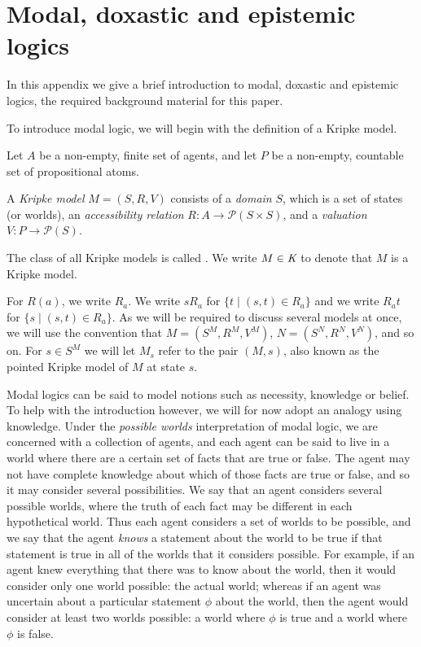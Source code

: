 \chapter{Modal, doxastic and epistemic logics}\label{modal}

In this appendix we give a brief introduction to modal, doxastic and epistemic
logics, the required background material for this paper.

To introduce modal logic, we will begin with the definition of a Kripke model.

Let $A$ be a non-empty, finite set of agents, and let $P$ be a non-empty,
countable set of propositional atoms.

\begin{definition}
A \textit{Kripke model} $M = (S, R, V)$ consists of a \textit{domain} $S$, which
is a set of states (or worlds), an \textit{accessibility relation} $R : A \to
\mathcal{P}(S \times S)$, and a \textit{valuation} $V : P \to \mathcal{P}(S)$. 

The class of all Kripke models is called \classK{}. We write $M \in \textit{K}{}$
to denote that $M$ is a Kripke model.
\end{definition}

For $R(a)$, we write $R_a$. We write $sR_a$ for $\{t \mid (s, t) \in R_a\}$ and
we write $R_at$ for $\{s \mid (s, t) \in R_a\}$. As we will be required to
discuss several models at once, we will use the convention that $M = (S^M, R^M,
V^M)$, $N = (S^N, R^N, V^N)$, and so on. For $s \in S^M$ we will let $M_s$ refer
to the pair $(M, s)$, also known as the pointed Kripke model of $M$ at state
$s$.

Modal logics can be said to model notions such as necessity, knowledge or
belief. To help with the introduction however, we will for now adopt an analogy
using knowledge. Under the {\em possible worlds} interpretation of modal logic,
we are concerned with a collection of agents, and each agent can be said to live
in a world where there are a certain set of facts that are true or false. The
agent may not have complete knowledge about which of those facts are true or
false, and so it may consider several possibilities. We say that an agent
considers several possible worlds, where the truth of each fact may be different
in each hypothetical world. Thus each agent considers a set of worlds to be
possible, and we say that the agent {\em knows} a statement about the world to
be true if that statement is true in all of the worlds that it considers
possible. For example, if an agent knew everything that there was to know about
the world, then it would consider only one world possible: the actual world;
whereas if an agent was uncertain about a particular statement $\phi$ about the
world, then the agent would consider at least two worlds possible: a world where
$\phi$ is true and a world where $\phi$ is false.

